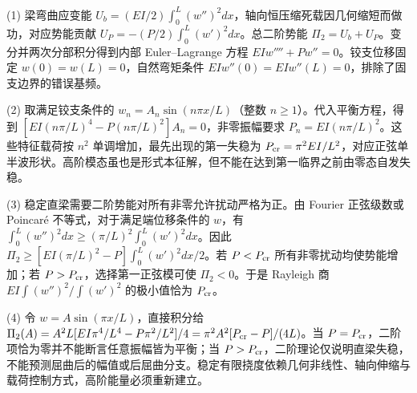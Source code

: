 (1) 梁弯曲应变能 \(U_b=(EI/2)\int_0^L(w'')^2dx\)，轴向恒压缩死载因几何缩短而做功，对应势能贡献 \(U_P=-(P/2)\int_0^L(w')^2dx\)。总二阶势能 \(\Pi_2=U_b+U_P\)。变分并两次分部积分得到内部 Euler--Lagrange 方程 \(EIw''''+Pw''=0\)。铰支位移固定 \(w(0)=w(L)=0\)，自然弯矩条件 \(EIw''(0)=EIw''(L)=0\)，排除了固支边界的错误基频。

(2) 取满足铰支条件的 \(w_n=A_n\sin(n\pi x/L)\)（整数 \(n\ge1\)）。代入平衡方程，得到 \([EI(n\pi/L)^4-P(n\pi/L)^2]A_n=0\)，非零振幅要求 \(P_n=EI(n\pi/L)^2\)。这些特征载荷按 \(n^2\) 单调增加，最先出现的第一失稳为 \(P_{\rm cr}=\pi^2EI/L^2\)，对应正弦单半波形状。高阶模态虽也是形式本征解，但不能在达到第一临界之前由零态自发失稳。

(3) 稳定直梁需要二阶势能对所有非零允许扰动严格为正。由 Fourier 正弦级数或 Poincaré 不等式，对于满足端位移条件的 \(w\)，有 \(\int_0^L(w'')^2dx\ge(\pi/L)^2\int_0^L(w')^2dx\)。因此 \(\Pi_2\ge[EI(\pi/L)^2-P]\int_0^L(w')^2dx/2\)。若 \(P<P_{\rm cr}\) 所有非零扰动均使势能增加；若 \(P>P_{\rm cr}\)，选择第一正弦模可使 \(\Pi_2<0\)。于是 Rayleigh 商 \(EI\int(w'')^2/\int(w')^2\) 的极小值恰为 \(P_{\rm cr}\)。

(4) 令 \(w=A\sin(\pi x/L)\)，直接积分给 \(\Pi_2(A)=A^2L[EI\pi^4/L^4-P\pi^2/L^2]/4=\pi^2A^2[P_{\rm cr}-P]/(4L)\)。当 \(P=P_{\rm cr}\)，二阶项恰为零并不能断言任意振幅皆为平衡；当 \(P>P_{\rm cr}\)，二阶理论仅说明直梁失稳，不能预测屈曲后的幅值或后屈曲分支。稳定有限挠度依赖几何非线性、轴向伸缩与载荷控制方式，高阶能量必须重新建立。
